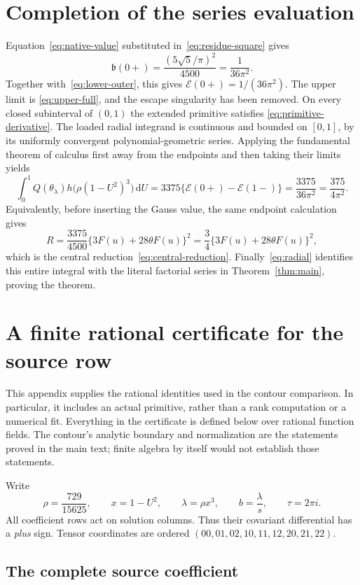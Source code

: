 \documentclass[11pt,a4paper]{article}
\newcommand{\dd}{\mathrm d}
\begin{document}
\section{Completion of the series evaluation}
Equation~\eqref{eq:native-value} substituted in~\eqref{eq:residue-square}
gives
\[
 \mathfrak b(0+)=\frac{(5\sqrt5/\pi)^2}{4500}
              =\frac{1}{36\pi^2}.
\]
Together with~\eqref{eq:lower-outer}, this gives
$\mathcal E(0+)=1/(36\pi^2)$. The upper limit is
\eqref{eq:upper-full}, and the escape singularity has been removed.
On every closed subinterval of $(0,1)$ the extended primitive satisfies
\eqref{eq:primitive-derivative}. The loaded radial integrand is continuous
and bounded on $[0,1]$, by its uniformly convergent polynomial-geometric
series. Applying the fundamental theorem of calculus first away from
the endpoints and then taking their limits yields
\[
 \int_0^1Q(\theta_\lambda)h\bigl(\rho(1-U^2)^3\bigr)\,\dd U
   =3375\{\mathcal E(0+)-\mathcal E(1-)\}
   =\frac{3375}{36\pi^2}=\frac{375}{4\pi^2}.
\]
Equivalently, before inserting the Gauss value, the same endpoint
calculation gives
\[
 R=\frac{3375}{4500}\{3F(u)+28\theta F(u)\}^2
   =\frac34\{3F(u)+28\theta F(u)\}^2,
\]
which is the central reduction~\eqref{eq:central-reduction}.
Finally~\eqref{eq:radial} identifies this entire integral with the
literal factorial series in Theorem~\ref{thm:main}, proving the theorem.

\appendix
\section{A finite rational certificate for the source row}
\label{app:certificates}

This appendix supplies the rational identities used in the contour
comparison.  In particular, it includes an actual primitive, rather than a
rank computation or a numerical fit.  Everything in the certificate is
defined below over rational function fields.  The contour's analytic
boundary and normalization are the statements proved in the main text;
finite algebra by itself would not establish those statements.

Write
\[
 \rho=\frac{729}{15625},\qquad x=1-U^2,\qquad
 \lambda=\rho x^3,\qquad b=\frac{\lambda}{s},\qquad
 \tau=2\pi i.
\]
All coefficient rows act on solution columns.  Thus their covariant
differential has a \emph{plus} sign.  Tensor coordinates are ordered
\((00,01,02,10,11,12,20,21,22)\).

\subsection{The complete source coefficient}
\end{document}
